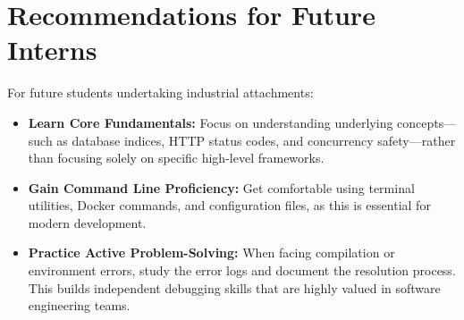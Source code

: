 \section{Recommendations for Future Interns}
For future students undertaking industrial attachments:
\begin{itemize}
    \item \textbf{Learn Core Fundamentals:} Focus on understanding underlying concepts—such as database indices, HTTP status codes, and concurrency safety—rather than focusing solely on specific high-level frameworks.
    \item \textbf{Gain Command Line Proficiency:} Get comfortable using terminal utilities, Docker commands, and configuration files, as this is essential for modern development.
    \item \textbf{Practice Active Problem-Solving:} When facing compilation or environment errors, study the error logs and document the resolution process. This builds independent debugging skills that are highly valued in software engineering teams.
\end{itemize}
